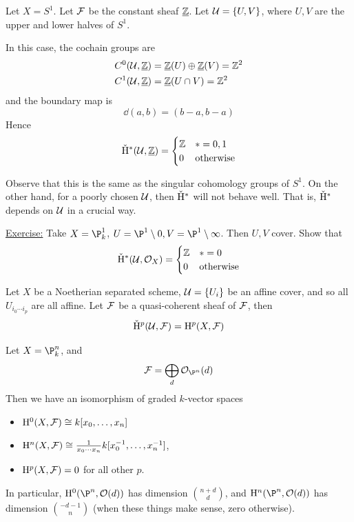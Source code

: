 \documentclass{article}
\begin{document}
\begin{example}
    Let \(X = S^1\). Let \(\mathcal{F}\) be the constant sheaf \(\underline{\mathbb{Z}}\). Let \(\mathcal{U} = \{U, V\}\), where \(U, V\) are the upper and lower halves of \(S^1\).

    In this case, the cochain groups are
    \begin{align*}
        C^0(\mathcal{U}, \underline{\mathbb{Z}}) &= \underline{\mathbb{Z}}(U) \oplus \underline{\mathbb{Z}}(V) = \mathbb{Z}^2 \\
        C^1(\mathcal{U}, \underline{\mathbb{Z}}) &= \underline{\mathbb{Z}}(U \cap V) = \mathbb{Z}^2
    \end{align*}
    and the boundary map is
    \[\dd(a, b) = (b - a, b - a)\]
    Hence
    \[\check {\mathrm{H}}^*(\mathcal{U}, \underline{\mathbb{Z}}) = \begin{cases}
        \mathbb{Z} & * = 0, 1 \\
        0 & \text{otherwise}
    \end{cases}\]
\end{example}
Observe that this is the same as the singular cohomology groups of \(S^1\). On the other hand, for a poorly chosen \(\mathcal{U}\), then \(\check {\mathrm{H}}^*\) will not behave well. That is, 
\(\check {\mathrm{H}}^*\) depends on \(\mathcal{U}\) in a crucial way.

\underline{Exercise:} Take \(X = \P_k^1\), \(U = \P^1 \setminus 0, V = \P^1 \setminus \infty\). Then \(U, V\) cover. Show that
\[\check {\mathrm{H}}^*(\mathcal{U}, \mathcal{O}_X) = \begin{cases}
    \mathbb{Z} & * = 0 \\
    0 &\text{otherwise}
\end{cases}\]

\begin{proposition}
    Let \(X\) be a Noetherian separated scheme, \(\mathcal{U} = \{U_i\}\) be an affine cover, and so all \(U_{i_0\cdots i_p}\) are all affine. Let \(\mathcal{F}\) be a quasi-coherent sheaf of \(\mathcal{F}\), then
    \[\check{\mathrm{H}}^p(\mathcal{U}, \mathcal{F}) = \mathrm{H}^p(X, \mathcal{F})\]
\end{proposition}

\begin{proposition}
    Let \(X = \P^n_k\), and
    \[\mcF = \bigoplus_d \mcO_{\P^n}(d)\]
    Then we have an isomorphism of graded \(k\)-vector spaces
    \begin{itemize}
        \item \(\mathrm{H}^0(X, \mathcal{F}) \cong k[x_0, \dots, x_n]\)
        \item \(\mathrm{H}^n(X, \mathcal{F}) \cong \frac{1}{x_0\cdots x_n}k[x_0^{-1}, \dots, x_n^{-1}]\),
        \item \(\mathrm{H}^p(X, \mathcal{F}) = 0\) for all other \(p\).
    \end{itemize}
    In particular, \(\HH^0(\P^n, \mcO(d))\) has dimension \(n + d \choose d\), and \(\HH^n(\P^n, \mcO(d))\) has dimension \(-d-1 \choose n\) (when these things make sense, zero otherwise).
\end{proposition}
\end{document}
